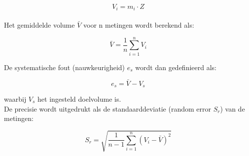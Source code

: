 \begin{equation} V_i = m_i \cdot Z \end{equation}
\pagebreak
\\Het gemiddelde volume $\bar{V}$ voor n metingen wordt berekend als:

\begin{equation} \bar{V} = \frac{1}{n} \sum_{i=1}^{n} V_i \end{equation}

De systematische fout (nauwkeurigheid) $e_s$ wordt dan gedefinieerd als:

\begin{equation} e_s = \bar{V} - V_s \end{equation}

waarbij $V_s$ het ingesteld doelvolume is. 
\\[12pt]De precisie wordt uitgedrukt als de standaarddeviatie (random error $S_r$) van de metingen:

\begin{equation} S_r = \sqrt{ \frac{1}{n-1} \sum_{i=1}^{n} {(V_i - \bar{V})}^2 } \end{equation}